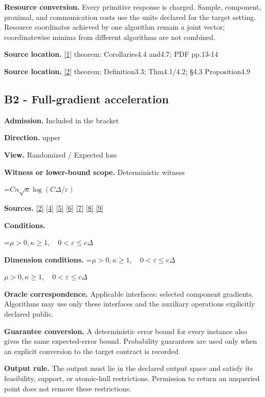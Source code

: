 \documentclass[10pt,a4paper]{article}
\newcommand{\AtlasMath}[1]{\par\begingroup\centering\setbox0=\hbox{$\displaystyle #1$}\ifdim\wd0>1.4\linewidth\typeout{ATLAS WIDE FORMULA: \the\wd0}\fi\ifdim\wd0>\linewidth\resizebox{\linewidth}{!}{\box0}\else\box0\fi\par\endgroup}
\newcommand{\AtlasInlineMath}[1]{\begingroup\setbox0=\hbox{$#1$}\ifdim\wd0>.4\linewidth\endgroup\AtlasMath{#1}\else\endgroup$#1$\fi}
\begin{document}
\textbf{Resource conversion.} Every primitive response is charged. Sample, component, proximal, and communication costs use the units declared for the target setting. Resource coordinates achieved by one algorithm remain a joint vector; coordinatewise minima from different algorithms are not combined.

\textbf{Source location.} \href{https://arxiv.org/pdf/1802.03866}{[1]} theorem: Corollaries4.4 and4.7; PDF pp.13-14

\textbf{Source location.} \href{https://proceedings.mlr.press/v97/zhou19b/zhou19b.pdf}{[2]} theorem: Definition3.3; Thm4.1/4.2; §4.3 Proposition4.9

\subsection{B2 - Full-gradient acceleration}
\textbf{Admission.} Included in the bracket

\textbf{Direction.} upper

\textbf{View.} Randomized / Expected loss

\textbf{Witness or lower-bound scope.} Deterministic witness

\AtlasMath{Cn\sqrt\kappa\log(C\Delta/\varepsilon)}
\textbf{Sources.} \href{https://proceedings.mlr.press/v97/zhou19b/zhou19b.pdf}{[2]} \href{https://arxiv.org/pdf/1405.4980}{[4]} \href{https://arxiv.org/pdf/2101.09740v2}{[5]} \href{https://arxiv.org/pdf/2609.33360v2}{[6]} \href{https://arxiv.org/pdf/2609.10874}{[7]} \href{https://www2.isye.gatech.edu/~nemirovs/MOR_AccuracyCertificates.pdf}{[8]} \href{https://arxiv.org/pdf/2609.20701}{[9]}

\textbf{Conditions.} 
\AtlasMath{\mu>0,\kappa\ge1,\quad0<\varepsilon\le c\Delta}


\textbf{Dimension conditions.} \AtlasInlineMath{\mu>0,\kappa\ge1,\quad0<\varepsilon\le c\Delta}

\textbf{Oracle correspondence.} Applicable interfaces: selected component gradients. Algorithms may use only these interfaces and the auxiliary operations explicitly declared public.

\textbf{Guarantee conversion.} A deterministic error bound for every instance also gives the same expected-error bound. Probability guarantees are used only when an explicit conversion to the target contract is recorded.

\textbf{Output rule.} The output must lie in the declared output space and satisfy its feasibility, support, or atomic-hull restrictions. Permission to return an unqueried point does not remove these restrictions.
\end{document}
